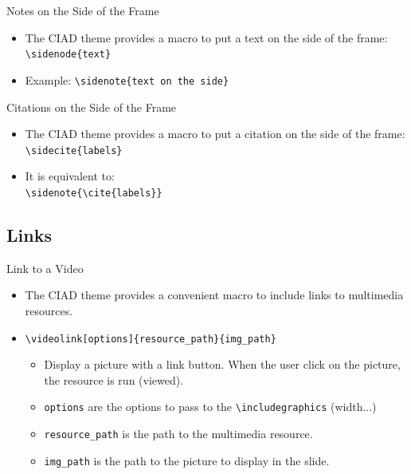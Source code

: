 \documentclass[english,sectioncirclenumberstyle]{ciadbeamer}
\begin{document}
\begin{frame}{Notes on the Side of the Frame}
	\begin{itemize}
	\item The CIAD theme provides a macro to put a text on the side of the frame: \\
		\texttt{{\textbackslash}sidenode\{text\}}
	\vspace{1em}
	\item Example: \texttt{{\textbackslash}sidenote\{text on the side\}}
	\end{itemize}
\end{frame}

\begin{frame}{Citations on the Side of the Frame}
	\begin{itemize}
	\item The CIAD theme provides a macro to put a citation on the side of the frame: \\
		\texttt{{\textbackslash}sidecite\{labels\}}
	\vspace{1em}
	\item It is equivalent to: \\
		\texttt{{\textbackslash}sidenote\{{\textbackslash}cite\{labels\}\}}
	\end{itemize}
\end{frame}

\subsection{Links}
\tableofcontentslide[sectionstyle={show/shaded},subsectionstyle={show/shaded/hide},subsubsectionstyle={hide/hide/hide/hide},sections={3-}]

\begin{frame}[t]{Link to a Video}
	\begin{itemize}
	\item The CIAD theme provides a convenient macro to include links to multimedia resources.
	\item \texttt{{\textbackslash}videolink[options]\{resource\_path\}\{img\_path\}}
		\begin{itemize}
		\item Display a picture with a link button. When the user click on the picture, the resource is run (viewed).
		\item \texttt{options} are the options to pass to the \texttt{{\textbackslash}includegraphics} (width...)
		\item \texttt{resource\_path} is the path to the multimedia resource.
		\item \texttt{img\_path} is the path to the picture to display in the slide.
		\end{itemize}
	\end{itemize}
	\begin{center}
	\end{center}
\end{frame}
\end{document}
